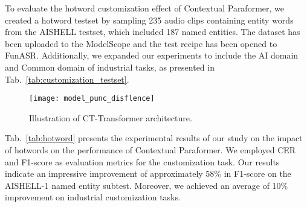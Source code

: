\documentclass{INTERSPEECH2023}
\begin{document}
\begin{table}[h]
\vspace{-1mm}
    \centering
    \caption{Evaluation of hotword customization}
    \vspace{-2mm}
    \label{tab:hotword}
    \vspace{-3mm}
\end{table}

To evaluate the hotword customization effect of Contextual Paraformer, we created a hotword testset by sampling 235 audio clips containing entity words from the AISHELL testset, which included 187 named entities. The dataset has been uploaded to the ModelScope and the test recipe has been opened to FunASR. Additionally, we expanded our experiments to include the AI domain and Common domain of industrial tasks, as presented in Tab.~\ref{tab:customization_testset}.


\begin{figure}
    \centering
    \texttt{[image: model\_punc\_disflence]}
    \caption{Illustration of CT-Transformer architecture.}
    \label{fig:CT-Transformer}
    \vspace{-3mm}
\end{figure}



Tab.~\ref{tab:hotword} presents the experimental results of our study on the impact of hotwords on the performance of Contextual Paraformer. We employed CER and F1-score as evaluation metrics for the customization task. Our results indicate an impressive improvement of approximately 58\% in F1-score on the AISHELL-1 named entity subtest. Moreover, we achieved an average of 10\% improvement on industrial customization tasks.
\end{document}
